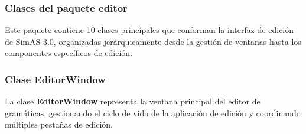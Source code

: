 \subsubsection{Clases del paquete editor}

Este paquete contiene 10 clases principales que conforman la interfaz de edición de SimAS 3.0, organizadas jerárquicamente desde la gestión de ventanas hasta los componentes específicos de edición.

\subsubsection{Clase EditorWindow}

La clase \textbf{EditorWindow} representa la ventana principal del editor de gramáticas, gestionando el ciclo de vida de la aplicación de edición y coordinando múltiples pestañas de edición.

